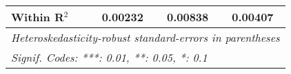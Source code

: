 \begin{table}[htbp]
\begin{adjustbox}{max width = \textwidth, center}
\begin{tabular}{lccc}
         Within R$^2$                                      & 0.00232                     & 0.00838                       & 0.00407\\  
         \midrule \midrule
         \multicolumn{4}{l}{\emph{Heteroskedasticity-robust standard-errors in parentheses}}\\
         \multicolumn{4}{l}{\emph{Signif. Codes: ***: 0.01, **: 0.05, *: 0.1}}\\
      \end{tabular}
   \end{adjustbox}
\end{table}


